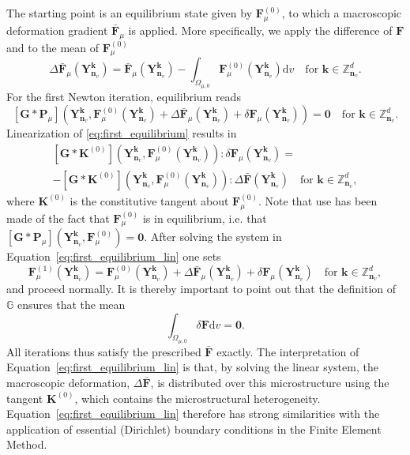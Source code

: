 The starting point is an equilibrium state given by \({\bm{F}}_\mu^{(0)}\), to which  a macroscopic deformation gradient \(\bar{\bm{F}}_\mu\) is applied.
More specifically, we apply the difference of \(\bm{\bm{F}}\) and to the mean of \({\bm{F}}_\mu^{(0)}\)
\begin{equation}
\Delta \bar{\bm{F}}_\mu\left(\bm Y_{\bm n_v}^{\bm  k}\right)=\bar{\boldsymbol{F}}_\mu\left(\bm Y_{\bm n_v}^{\bm  k}\right)-\int_{\Omega_{\mu,0}} {\bm{F}}_\mu^{(0)}\left(\bm Y_{\bm n_v}^{\bm  k}\right) \mathrm{d} v\quad \text{for \(\bm k \in \mathbb Z^d_{\bm n_v}\)}.
\end{equation}
For the first Newton iteration, equilibrium reads
\begin{equation} \label{eq:first_equilibrium}
[\bm{G}* \bm {P}_\mu]\left(\bm Y_{\bm n_v}^{\bm  k},\bm{F}_\mu^{(0)}\left(\bm Y_{\bm n_v}^{\bm  k}\right)+\Delta \bar{\boldsymbol{F}}_\mu\left(\bm Y_{\bm n_v}^{\bm  k}\right)+\delta {\boldsymbol{F}}_\mu\left(\bm Y_{\bm n_v}^{\bm  k}\right)\right)=\bm{0}\quad \text{for \(\bm k \in \mathbb Z^d_{\bm n_v}\)}.
\end{equation}
Linearization of \eqref{eq:first_equilibrium} results in
\begin{multline}\label{eq:first_equilibrium_lin}
[\bm{G}* \bm{K}^{(0)}]\left(\bm Y_{\bm n_v}^{\bm  k}, \bm F_\mu^{(0)}\left(\bm Y_{\bm n_v}^{\bm  k}\right)\right): \delta \bm{F}_\mu\left(\bm Y_{\bm n_v}^{\bm  k}\right)=\\-[\bm{G}* \bm{K}^{(0)}]\left(\bm Y_{\bm n_v}^{\bm  k}, \bm F_\mu^{(0)}\left(\bm Y_{\bm n_v}^{\bm  k}\right)\right): \Delta \bar{\bm{F}}\left(\bm Y_{\bm n_v}^{\bm  k}\right)\quad \text{for \(\bm k \in \mathbb Z^d_{\bm n_v}\)},
\end{multline}
where \(\bm{K}^{(0)}\) is the constitutive tangent about \({\bm{F}}_\mu^{(0)}\).
Note that use has been made of the fact that \({\bm{F}}_\mu^{(0)}\) is in equilibrium, i.e. that \([\bm G * \bm P_\mu]\left(\bm Y_{\bm n_v}^{\bm  k}, {\bm{F}}_\mu^{(0)}\right)={\bm{0}}\).
After solving the system in Equation~\eqref{eq:first_equilibrium_lin} one sets
\begin{equation}
{\bm{F}}_\mu^{(1)}\left(\bm Y_{\bm n_v}^{\bm  k}\right)={\bm{F}}_\mu^{(0)}\left(\bm Y_{\bm n_v}^{\bm  k}\right)+\Delta \bar{\bm{F}}_\mu\left(\bm Y_{\bm n_v}^{\bm  k}\right)+\delta {\bm{F}}_\mu\left(\bm Y_{\bm n_v}^{\bm  k}\right)\quad \text{for \(\bm k \in \mathbb Z^d_{\bm n_v}\)},
\end{equation}
and proceed normally.
It is thereby important to point out that the definition of \(\mathbb{G}\) ensures that the mean
\begin{equation}
\int_{\Omega_{\mu,0}} \delta {\bm {F}} \mathrm{d} v=\boldsymbol{0}.
\end{equation}
All iterations thus satisfy the prescribed \(\bar{\bm{F}}\) exactly.
The interpretation of Equation~\eqref{eq:first_equilibrium_lin} is that, by solving the linear system, the macroscopic deformation, \(\Delta \bar{\bm{F}}\), is distributed over this microstructure using the tangent \(\bm{K}^{(0)}\), which contains the microstructural heterogeneity.
Equation~\eqref{eq:first_equilibrium_lin} therefore has strong similarities with the application of essential (Dirichlet) boundary conditions in the Finite Element Method.
\bigskip

